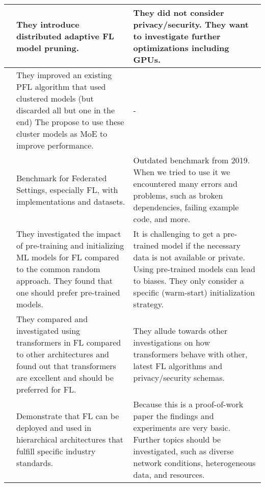 \begin{changemargin}{-2cm}{0cm}
\begin{tabular}{|c||m{0.4\paperwidth}|m{0.4\paperwidth}|}
            &
            They introduce distributed adaptive FL model pruning.
            &
            They did not consider privacy/security.
            They want to investigate further optimizations including GPUs.
        \\
        \hline
            \cite{paper:adaptive_exper_models_for_pfl}
            &
            They improved an existing PFL algorithm that used clustered models (but discarded all but one in the end)
            The propose to use these cluster models as MoE to improve performance.
            &
            -
        \\
        \hline
            \cite{paper:leaf_fl_benchmark}
            &
            Benchmark for Federated Settings, especially FL, with implementations and datasets.
            &
            Outdated benchmark from 2019.
            When we tried to use it we encountered many errors and problems,
            such as broken dependencies, failing example code, and more.
        \\
        \hline
            \cite{paper:model_pretraining_and_initialization_for_fl}
            &
            They investigated the impact of pre-training and initializing
            ML models for FL compared to the common random approach.
            They found that one should prefer pre-trained models.
            &
            It is challenging to get a pre-trained model if the necessary data is not available or private.
            Using pre-trained models can lead to biases.
            They only consider a specific (warm-start) initialization strategy.
        \\
        \hline
            \cite{paper:rethinking_architecture_design_in_fl_for_diverse_data}
            &
            They compared and investigated using transformers in FL compared to other architectures
            and found out that transformers are excellent and should be preferred for FL.
            &
            They allude towards other investigations on how transformers behave with other, latest FL algorithms and privacy/security schemas.
        \\
        \hline
            \cite{paper:deploying_fl_in_hierarchical_edge_architecture}
            &
            Demonstrate that FL can be deployed and used in hierarchical architectures that fulfill specific industry standards.
            &
            Because this is a proof-of-work paper the findings and experiments are very basic.
            Further topics should be investigated, such as diverse network conditions, heterogeneous data, and resources.

\end{tabular}
\end{changemargin}
